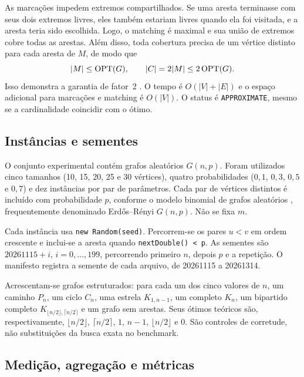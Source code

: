 As marcações impedem extremos compartilhados. Se uma aresta terminasse
com seus dois extremos livres, eles também estariam livres quando
ela foi visitada, e a aresta teria sido escolhida. Logo, o matching
é maximal e sua união de extremos cobre todas as arestas. Além disso,
toda cobertura precisa de um vértice distinto para cada aresta de $M$,
de modo que
\begin{equation}
  |M|\leq\operatorname{OPT}(G),\qquad |C|=2|M|\leq2\operatorname{OPT}(G).
  \label{eq:factor}
\end{equation}
Isso demonstra a garantia de fator~2 \cite{cormen2022,vazirani2001}.
O tempo é $O(|V|+|E|)$ e o espaço adicional para marcações e matching
é $O(|V|)$. O status é \texttt{APPROXIMATE}, mesmo se a cardinalidade
coincidir com o ótimo.

\subsection{Instâncias e sementes}

O conjunto experimental contém \RandomInstances{} grafos aleatórios
$G(n,p)$. Foram utilizados cinco tamanhos (10, 15, 20, 25 e 30
vértices), quatro probabilidades ($0{,}1$, $0{,}3$, $0{,}5$ e
$0{,}7$) e dez instâncias por par de parâmetros.
Cada par de vértices distintos é incluído com probabilidade $p$,
conforme o modelo binomial de grafos aleatórios \cite{gilbert1959},
frequentemente denominado Erdős--Rényi $G(n,p)$. Não se fixa $m$.

Cada instância usa \texttt{new Random(seed)}. Percorrem-se os pares
$u<v$ em ordem crescente e inclui-se a aresta quando
\texttt{nextDouble() < p}. As sementes são $20261115+i$,
$i=0,\ldots,199$, percorrendo primeiro $n$, depois $p$ e a repetição.
O manifesto registra a semente de cada arquivo, de 20261115 a 20261314.

Acrescentam-se \StructuredInstances{} grafos estruturados: para cada
um dos cinco valores de $n$, um caminho $P_n$, um ciclo $C_n$,
uma estrela $K_{1,n-1}$, um completo $K_n$, um bipartido completo
$K_{\lfloor n/2\rfloor,\lceil n/2\rceil}$ e um grafo sem arestas.
Seus ótimos teóricos são, respectivamente,
$\lfloor n/2\rfloor$, $\lceil n/2\rceil$, $1$, $n-1$,
$\lfloor n/2\rfloor$ e $0$. São controles de corretude, não
substituições da busca exata no benchmark.

\subsection{Medição, agregação e métricas}

